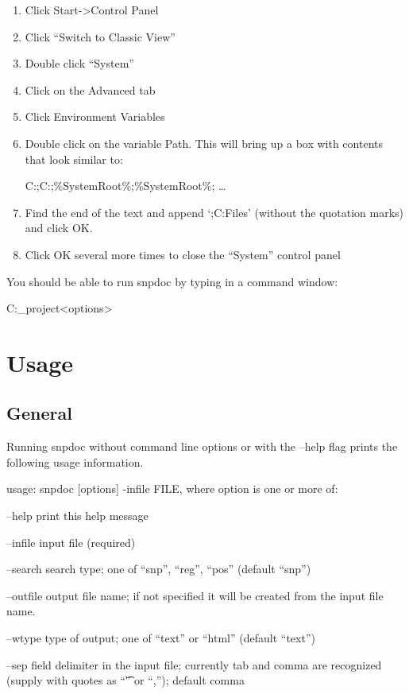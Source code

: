 \documentclass[11pt]{article}
\begin{document}
\begin{enumerate}
\item Click Start->Control Panel
\item Click ``Switch to Classic View''
\item Double click ``System''
\item Click on the Advanced tab
\item Click Environment Variables
\item Double click on the variable Path.  This will bring up a box with contents
      that look similar to:

      C:\Perl\site\bin;C:\Perl\bin;\%SystemRoot\%;\%SystemRoot\%; \ldots{}
\item Find the end of the text and append `;C:\Program Files\snpdoc\bin'
      (without the quotation marks) and click OK.
\item Click OK several more times to close the ``System'' control panel
\end{enumerate}

   You should be able to run snpdoc by typing in a command window:

   C:\my\_project\snpdoc <options>
\section{Usage}
\label{sec-3}
\subsection{General}
\label{sec-3_1}


   Running snpdoc without command line options or with the --help flag
   prints the following usage information.

   usage:
   snpdoc [options] -infile FILE, where option is one or more of:

   --help          print this help message

   --infile        input file (required)

   --search        search type; one of ``snp'', ``reg'', ``pos'' (default ``snp'')

   --outfile       output file name; if not specified it will be created
                   from the input file name.

   --wtype         type of output; one of ``text'' or ``html'' (default ``text'')

   --sep           field delimiter in the input file; currently tab and comma
                   are recognized (supply with quotes as ``\t'' or ``,'');
                   default comma
\end{document}
